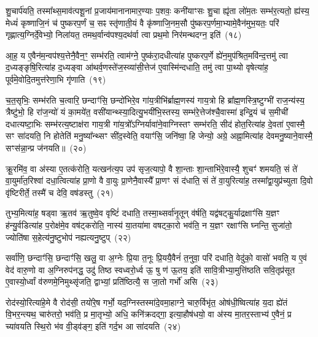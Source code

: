 शु॒चार्प॑यति॒ तस्मा᳚थ्स॒माव॑त्पशू॒नां प्र॒जाय॑मानानामार॒ण्याः प॒शवः॒ कनी॑याꣳसः शु॒चा ह्यृ॑ता लो॑म॒तः सम्भ॑र॒त्यतो॒ ह्य॑स्य॒ मेध्यं॑ कृष्णाजि॒नं च॑ पुष्करप॒र्णं च॒ सꣴ स्तृ॑णाती॒यं वै कृ॑ष्णाजि॒नम॒सौ पु॑ष्करप॒र्णमा॒भ्यामे॒वैन॑मुभ॒यतः॒ परि॑ गृह्णात्य॒ग्निर्दे॒वेभ्यो॒ निला॑यत॒ तमथ॒र्वान्व॑पश्य॒दथ॑र्वा त्वा प्रथ॒मो निर॑मन्थदग्न॒ इति॑~(१८)

आ॒ह॒ य ए॒वैन॑म॒न्वप॑श्य॒त्तेनै॒वैन॒ꣳ॒ सम्भ॑रति॒ त्वाम॑ग्ने॒ पुष्क॑रा॒दधीत्या॑ह पुष्करप॒र्णे ह्ये॑न॒मुप॑श्रित॒मवि॑न्द॒त्तमु॑ त्वा द॒ध्यङ्ङृषि॒रित्या॑ह द॒ध्यङ्वा आ॑थर्व॒णस्ते॑ज॒स्व्या॑सी॒त्तेज॑ ए॒वास्मि॑न्दधाति॒ तमु॑ त्वा पा॒थ्यो वृषेत्या॑ह॒ पूर्व॑मे॒वोदि॒तमुत्त॑रेणा॒भि गृ॑णाति~(१९)

च॒त॒सृभिः॒ सम्भ॑रति च॒त्वारि॒ छन्दाꣳ॑सि॒ छन्दो॑भिरे॒व गा॑य॒त्रीभि॑र्ब्राह्म॒णस्य॑ गाय॒त्रो हि ब्रा᳚ह्म॒णस्त्रि॒ष्टुग्भी॑ राज॒न्य॑स्य॒ त्रैष्टु॑भो॒ हि रा॑ज॒न्यो॑ यं का॒मये॑त॒ वसी॑यान्थ्स्या॒दित्यु॒भयी॑भि॒स्तस्य॒ सम्भ॑रे॒त्तेज॑श्चै॒वास्मा॑ इन्द्रि॒यं च॑ स॒मीची॑ दधात्यष्टा॒भिः सम्भ॑रत्य॒ष्टाक्ष॑रा गाय॒त्री गा॑य॒त्रो᳚\-ऽग्निर्यावा॑ने॒वाग्निस्तꣳ सम्भ॑रति॒ सीद॑ होत॒रित्या॑ह दे॒वता॑ ए॒वास्मै॒ सꣳ सा॑दयति॒ नि होतेति॑ मनु॒ष्या᳚न्थ्सꣳ सी॑द॒स्वेति॒ वयाꣳ॑सि॒ जनि॑ष्वा॒ हि जेन्यो॒ अग्रे॒ अह्ना॒मित्या॑ह देवमनु॒ष्याने॒वास्मै॒ सꣳस॑न्ना॒न्प्र ज॑नयति॥~(२०)

{\anuvakamend[{ऐव प॒शूनिति॑ गृणाति होत॒रिति॑ स॒प्तविꣳ॑शतिश्च}]}%

क्रू॒रमि॑व॒ वा अ॑स्या ए॒तत्क॑रोति॒ यत्खन॑त्य॒प उप॑ सृज॒त्यापो॒ वै शा॒न्ताः शा॒न्ताभि॑रे॒वास्यै॒ शुचꣳ॑ शमयति॒ सं ते॑ वा॒युर्मा॑त॒रिश्वा॑ दधा॒त्वित्या॑ह प्रा॒णो वै वा॒युः प्रा॒णेनै॒वास्यै᳚ प्रा॒णꣳ सं द॑धाति॒ सं ते॑ वा॒युरित्या॑ह॒ तस्मा᳚द्वा॒युप्र॑च्युता दि॒वो वृ॑ष्टिरीर्ते॒ तस्मै॑ च देवि॒ वष॑डस्तु~(२१)

तुभ्य॒मित्या॑ह॒ षड्वा ऋ॒तव॑ ऋ॒तुष्वे॒व वृष्टिं॑ दधाति॒ तस्मा॒थ्सर्वा॑नृ॒तून् व॑र्\mbox{}षति॒ यद्व॑षट्कु॒र्याद्रक्षाꣳ॑सि य॒ज्ञꣳ ह॑न्यु॒र्वडित्या॑ह प॒रोक्ष॑मे॒व वष॑ट्करोति॒ नास्य॑ या॒तया॑मा वषट्का॒रो भव॑ति॒ न य॒ज्ञꣳ रक्षाꣳ॑सि घ्नन्ति॒ सुजा॑तो॒ ज्योति॑षा स॒हेत्य॑नु॒ष्टुभोप॑ नह्यत्यनु॒ष्टुप्~(२२)

सर्वा॑णि॒ छन्दाꣳ॑सि॒ छन्दाꣳ॑सि॒ खलु॒ वा अ॒ग्नेः प्रि॒या त॒नूः प्रि॒ययै॒वैनं॑ त॒नुवा॒ परि॑ दधाति॒ वेदु॑को॒ वासो॑ भवति॒ य ए॒वं वेद॑ वारु॒णो वा अ॒ग्निरुप॑नद्ध॒ उदु॑ तिष्ठ स्वध्वरो॒र्ध्व ऊ॒ षु ण॑ ऊ॒तय॒ इति॑ सावि॒त्रीभ्या॒मुत्ति॑ष्ठति सवि॒तृप्र॑सूत ए॒वास्यो॒र्ध्वां व॑रुणमे॒निमुथ्सृ॑जति॒ द्वाभ्यां॒ प्रति॑ष्ठित्यै॒ स जा॒तो गर्भो॑ असि~(२३)

रोद॑स्यो॒रित्या॑हे॒मे वै रोद॑सी॒ तयो॑रे॒ष गर्भो॒ यद॒ग्निस्तस्मा॑दे॒वमा॒हाग्ने॒ चारु॒र्विभृ॑त॒ ओष॑धी॒ष्वित्या॑ह य॒दा ह्ये॑तं वि॒भर॒न्त्यथ॒ चारु॑तरो॒ भव॑ति॒ प्र मा॒तृभ्यो॒ अधि॒ कनि॑क्रदद्गा॒ इत्या॒हौष॑धयो॒ वा अ॑स्य मा॒तर॒स्ताभ्य॑ ए॒वैनं॒ प्र च्या॑वयति स्थि॒रो भ॑व वी॒ड्व॑ङ्ग॒ इति॑ गर्द॒भ आ सा॑दयति~(२४)

